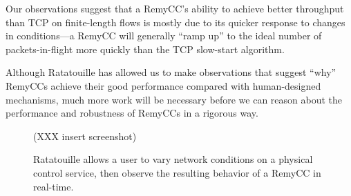 Our observations suggest that a RemyCC's ability to achieve better
throughput than TCP on finite-length flows is mostly due to its
quicker response to changes in conditions---a RemyCC will generally
``ramp up'' to the ideal number of packets-in-flight more quickly than
the TCP slow-start algorithm.

Although Ratatouille has allowed us to make observations that suggest
``why'' RemyCCs achieve their good performance compared with
human-designed mechanisms, much more work will be necessary before we
can reason about the performance and robustness of RemyCCs in a
rigorous way.

\begin{figure}
\caption{Ratatouille allows a user to vary network conditions on a
  physical control service, then observe the resulting behavior of a
  RemyCC in real-time.}
\label{fig:ratscreen}

\begin{center}

(XXX insert screenshot)

\end{center}
\end{figure}
